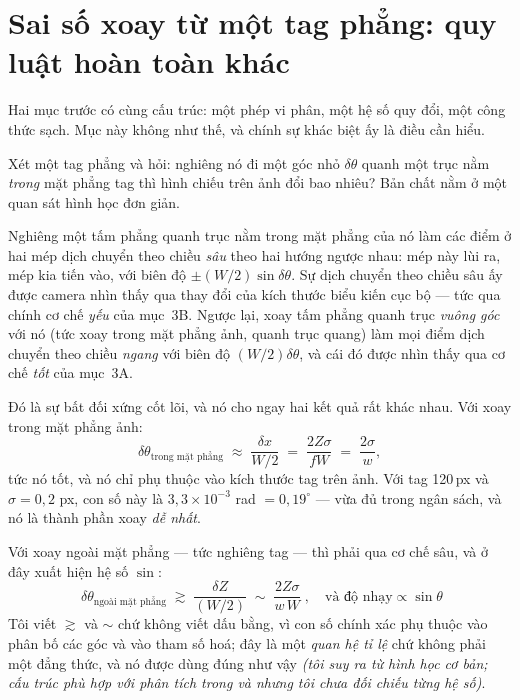 \documentclass[../../marker.tex]{subfiles}
\begin{document}
\section{Sai số xoay từ một tag phẳng: quy luật hoàn toàn khác}

Hai mục trước có cùng cấu trúc: một phép vi phân, một hệ số quy đổi, một công thức sạch. Mục này không như thế, và chính sự khác biệt ấy là điều cần hiểu.

Xét một tag phẳng và hỏi: nghiêng nó đi một góc nhỏ \(\delta\theta\) quanh một trục nằm \emph{trong} mặt phẳng tag thì hình chiếu trên ảnh đổi bao nhiêu? Bản chất nằm ở một quan sát hình học đơn giản.

Nghiêng một tấm phẳng quanh trục nằm trong mặt phẳng của nó làm các điểm ở hai mép dịch chuyển theo chiều \emph{sâu} theo hai hướng ngược nhau: mép này lùi ra, mép kia tiến vào, với biên độ \(\pm(W/2)\sin\delta\theta\). Sự dịch chuyển theo chiều sâu ấy được camera nhìn thấy qua thay đổi của kích thước biểu kiến cục bộ --- tức qua chính cơ chế \emph{yếu} của mục~3B. Ngược lại, xoay tấm phẳng quanh trục \emph{vuông góc} với nó (tức xoay trong mặt phẳng ảnh, quanh trục quang) làm mọi điểm dịch chuyển theo chiều \emph{ngang} với biên độ \((W/2)\delta\theta\), và cái đó được nhìn thấy qua cơ chế \emph{tốt} của mục~3A.

Đó là sự bất đối xứng cốt lõi, và nó cho ngay hai kết quả rất khác nhau. Với xoay trong mặt phẳng ảnh:
\[
\delta\theta_{\text{trong mặt phẳng}} \;\approx\; \frac{\delta x}{W/2} \;=\; \frac{2Z\sigma}{fW} \;=\; \frac{2\sigma}{w},
\]
tức nó tốt, và nó chỉ phụ thuộc vào kích thước tag trên ảnh. Với tag 120\,px và \(\sigma = 0{,}2\) px, con số này là \(3{,}3\times10^{-3}\) rad \(= 0{,}19^\circ\) --- vừa đủ trong ngân sách, và nó là thành phần xoay \emph{dễ nhất}.

Với xoay ngoài mặt phẳng --- tức nghiêng tag --- thì phải qua cơ chế sâu, và ở đây xuất hiện hệ số \(\sin\):
\begin{equation}
\boxed{\;\delta\theta_{\text{ngoài mặt phẳng}} \;\gtrsim\; \frac{\delta Z}{(W/2)} \;\sim\; \frac{2Z\sigma}{w\,W}\;, \quad \text{và độ nhạy} \propto \sin\theta}
\label{eq:a05-tilt}
\end{equation}
Tôi viết \(\gtrsim\) và \(\sim\) chứ không viết dấu bằng, vì con số chính xác phụ thuộc vào phân bố các góc và vào tham số hoá; đây là một \emph{quan hệ tỉ lệ} chứ không phải một đẳng thức, và nó được dùng đúng như vậy \emph{(tôi suy ra từ hình học cơ bản; cấu trúc phù hợp với phân tích trong \cite{schweighofer2006robust} và \cite{collins2014ippe} nhưng tôi chưa đối chiếu từng hệ số)}.
\end{document}
